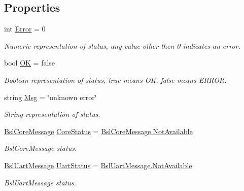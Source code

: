 \subsection*{Properties}
\begin{DoxyCompactItemize}
\item 
int \mbox{\hyperlink{class_b_s_l430___n_e_t_1_1_status_a87f62acd0c7cabf8da4adfc7a780dea6}{Error}} = 0
\begin{DoxyCompactList}\small\item\em Numeric representation of status, any value other then 0 indicates an error. \end{DoxyCompactList}\item 
bool \mbox{\hyperlink{class_b_s_l430___n_e_t_1_1_status_a02e494acbd7dbbbdc4b2c83ebc6006d2}{OK}} = false
\begin{DoxyCompactList}\small\item\em Boolean representation of status, true means OK, false means E\+R\+R\+OR. \end{DoxyCompactList}\item 
string \mbox{\hyperlink{class_b_s_l430___n_e_t_1_1_status_acba1ced827ba52a463c0a6c530aece11}{Msg}} = \char`\"{}unknown error\char`\"{}
\begin{DoxyCompactList}\small\item\em String representation of status. \end{DoxyCompactList}\item 
\mbox{\hyperlink{namespace_b_s_l430___n_e_t_ac916153c12b33a95ee1fd35e1a15f17a}{Bsl\+Core\+Message}} \mbox{\hyperlink{class_b_s_l430___n_e_t_1_1_status_a5f12c381516ea195adfee38c4f361d1f}{Core\+Status}} = \mbox{\hyperlink{namespace_b_s_l430___n_e_t_ae93ff76b832d2a9a0c3d67665e2f25aca534ceac854da4ba59c4dc41b7ab732dc}{Bsl\+Core\+Message.\+Not\+Available}}
\begin{DoxyCompactList}\small\item\em Bsl\+Core\+Message status. \end{DoxyCompactList}\item 
\mbox{\hyperlink{namespace_b_s_l430___n_e_t_ae93ff76b832d2a9a0c3d67665e2f25ac}{Bsl\+Uart\+Message}} \mbox{\hyperlink{class_b_s_l430___n_e_t_1_1_status_ad868a4102f279c1e07d732fd2d4cda74}{Uart\+Status}} = \mbox{\hyperlink{namespace_b_s_l430___n_e_t_ae93ff76b832d2a9a0c3d67665e2f25aca534ceac854da4ba59c4dc41b7ab732dc}{Bsl\+Uart\+Message.\+Not\+Available}}
\begin{DoxyCompactList}\small\item\em Bsl\+Uart\+Message status. \end{DoxyCompactList}\end{DoxyCompactItemize}


